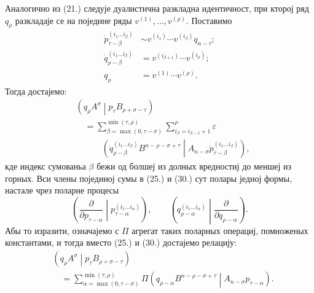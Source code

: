 ﻿\documentclass[11pt]{article}
\newcommand{\pair}[2]{\left(#1\middle|#2\right)}
\newcommand{\eps}{\varepsilon}
\begin{document}
Аналогично из (21.) следује дуалистична разкладна идентичност, при кторој ряд $q_\rho$ разкладаје се на поједине ряды $v^{(1)},\ldots,v^{(\rho)}$. Поставимо
\begin{equation}
\begin{aligned}
 \dot p_{\tau-\beta}^{(i_1\ldots i_\beta)}
&\sim v^{(i_1)}\cdots v^{(i_\beta)}q_{n-\tau};\\
 \dot q_{\rho-\beta}^{(i_1\ldots i_\beta)}
&=v^{(i_{\beta+1})}\cdots v^{(i_\rho)};\\
 q_\rho&=v^{(1)}\cdots v^{(\rho)}.
\end{aligned}
\tag{29}
\end{equation}
Тогда достајемо:
\begin{equation}
\begin{aligned}
&\pair{q_\rho A^\sigma}{p_\tau B_{\rho+\sigma-\tau}}\\
&\quad=\sum_{\beta=\max(0,\tau-\sigma)}^{\min(\tau,\rho)}
\sum_{i_\beta=i_{\beta-1}+1}^{\rho}\eps\\
&\qquad\quad\pair{\dot q_{\rho-\beta}^{(i_1\ldots i_\beta)}
B^{n-\rho-\sigma+\tau}}
{A_{n-\sigma}\dot p_{\tau-\beta}^{(i_1\ldots i_\beta)}} ,
\end{aligned}
\tag{30}
\end{equation}
кде индекс сумованьа $\beta$ бежи од болшеј из долных вредностиј до меншеј из горных. Вси члены појединој сумы в (25.) и (30.) сут полары једној формы, настале чрез поларне процесы
\[
\left(\frac{\partial}{\partial p_{\tau-\alpha}}\middle|
p_{\tau-\alpha}^{(i_1\ldots i_\alpha)}\right),\qquad
\left(q_{\rho-\alpha}^{(i_1\ldots i_\alpha)}\middle|
\frac{\partial}{\partial q_{\rho-\alpha}}\right).
\]
Абы то изразити, означајемо с $\Pi$ агрегат таких поларных операциј, помноженых константами, и тогда вместо (25.) и (30.) достајемо релацију:
\begin{equation}
\begin{aligned}
&\pair{q_\rho A^\sigma}{p_\tau B_{\rho+\sigma-\tau}}\\
&\quad=\sum_{\alpha=\max(0,\tau-\sigma)}^{\min(\tau,\rho)}
\Pi\pair{q_{\rho-\alpha}B^{n-\rho-\sigma+\tau}}
{A_{n-\sigma}p_{\tau-\alpha}}.
\end{aligned}
\tag{31}
\end{equation}
\end{document}
